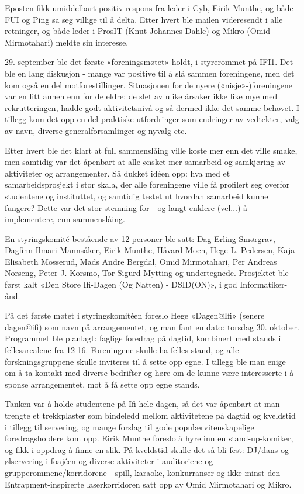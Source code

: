 Eposten fikk umiddelbart positiv respons fra leder i Cyb, Eirik Munthe, og både FUI og Ping sa seg villige til å delta. Etter hvert ble mailen videresendt i alle retninger, og både leder i ProsIT (Knut Johannes Dahle) og Mikro (Omid Mirmotahari) meldte sin interesse.

29. september ble det første «foreningsmøtet» holdt, i styrerommet på IFI1. Det ble en lang diskusjon - mange var positive til å slå sammen foreningene, men det kom også en del motforestillinger. Situasjonen for de nyere («nisje»-)foreningene var en litt annen enn for de eldre: de slet av ulike årsaker ikke like mye med rekrutteringen, hadde godt aktivitetsnivå og så dermed ikke det samme behovet. I tillegg kom det opp en del praktiske utfordringer som endringer av vedtekter, valg av navn, diverse generalforsamlinger og nyvalg etc.

Etter hvert ble det klart at full sammenslåing ville koste mer enn det ville smake, men samtidig var det åpenbart at alle ønsket mer samarbeid og samkjøring av aktiviteter og arrangementer. Så dukket idéen opp: hva med et samarbeidsprosjekt i stor skala, der alle foreningene ville få profilert seg overfor studentene og instituttet, og samtidig testet ut hvordan samarbeid kunne fungere? Dette var det stor stemning for - og langt enklere (vel...) å implementere, enn sammenslåing.

En styringskomité bestående av 12 personer ble satt: Dag-Erling Smørgrav, Dagfinn Ilmari Mannsåker, Eirik Munthe, Håvard Moen, Hege L. Pedersen, Kaja Elisabeth Mosserud, Mads Andre Bergdal, Omid Mirmotahari, Per Andreas Norseng, Peter J. Korsmo, Tor Sigurd Mytting og undertegnede. Prosjektet ble først kalt «Den Store Ifi-Dagen (Og Natten) - DSID(ON)», i god Informatiker-ånd.

På det første møtet i styringskomitéen foreslo Hege «Dagen@Ifi» (senere dagen@ifi) som navn på arrangementet, og man fant en dato: torsdag 30. oktober. Programmet ble planlagt: faglige foredrag på dagtid, kombinert med stands i fellesarealene fra 12-16. Foreningene skulle ha felles stand, og alle forskningsgruppene skulle inviteres til å sette opp egne. I tillegg ble man enige om å ta kontakt med diverse bedrifter og høre om de kunne være interesserte i å sponse arrangementet, mot å få sette opp egne stands.

Tanken var å holde studentene på Ifi hele dagen, så det var åpenbart at man trengte et trekkplaster som bindeledd mellom aktivitetene på dagtid og kveldstid i tillegg til servering, og mange forslag til gode populærvitenskapelige foredragsholdere kom opp. Eirik Munthe foreslo å hyre inn en stand-up-komiker, og fikk i oppdrag å finne en slik. På kveldstid skulle det så bli fest: DJ/dans og ølservering i foajéen og diverse aktiviteter i auditoriene og grupperommene/korridorene - spill, karaoke, konkurranser og ikke minst den Entrapment-inspirerte laserkorridoren satt opp av Omid Mirmotahari og Mikro.


